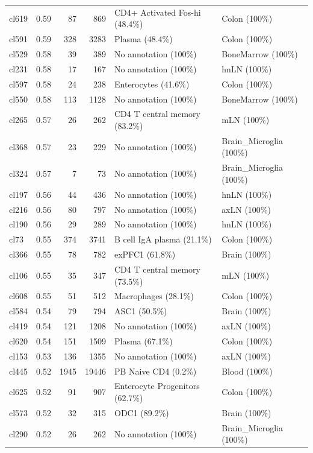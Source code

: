 \begin{table}[ht!]
\begin{tabular}{lrrrll}
  cl619 & 0.59 &  87 & 869 & CD4+ Activated Fos-hi (48.4\%) & Colon (100\%) \\ 
  cl591 & 0.59 & 328 & 3283 & Plasma (48.4\%) & Colon (100\%) \\ 
  cl529 & 0.58 &  39 & 389 & No annotation (100\%) & BoneMarrow (100\%) \\ 
  cl231 & 0.58 &  17 & 167 & No annotation (100\%) & hnLN (100\%) \\ 
  cl597 & 0.58 &  24 & 238 & Enterocytes (41.6\%) & Colon (100\%) \\ 
  cl550 & 0.58 & 113 & 1128 & No annotation (100\%) & BoneMarrow (100\%) \\ 
  cl265 & 0.57 &  26 & 262 & CD4 T central memory (83.2\%) & mLN (100\%) \\ 
  cl368 & 0.57 &  23 & 229 & No annotation (100\%) & Brain\_Microglia (100\%) \\ 
  cl324 & 0.57 &   7 &  73 & No annotation (100\%) & Brain\_Microglia (100\%) \\ 
  cl197 & 0.56 &  44 & 436 & No annotation (100\%) & hnLN (100\%) \\ 
  cl216 & 0.56 &  80 & 797 & No annotation (100\%) & axLN (100\%) \\ 
  cl190 & 0.56 &  29 & 289 & No annotation (100\%) & hnLN (100\%) \\ 
  cl73 & 0.55 & 374 & 3741 & B cell IgA plasma (21.1\%) & Colon (100\%) \\ 
  cl366 & 0.55 &  78 & 782 & exPFC1 (61.8\%) & Brain (100\%) \\ 
  cl106 & 0.55 &  35 & 347 & CD4 T central memory (73.5\%) & mLN (100\%) \\ 
  cl608 & 0.55 &  51 & 512 & Macrophages (28.1\%) & Colon (100\%) \\ 
  cl584 & 0.54 &  79 & 794 & ASC1 (50.5\%) & Brain (100\%) \\ 
  cl419 & 0.54 & 121 & 1208 & No annotation (100\%) & axLN (100\%) \\ 
  cl620 & 0.54 & 151 & 1509 & Plasma (67.1\%) & Colon (100\%) \\ 
  cl153 & 0.53 & 136 & 1355 & No annotation (100\%) & axLN (100\%) \\ 
  cl445 & 0.52 & 1945 & 19446 & PB Naive CD4  (0.2\%) & Blood (100\%) \\ 
  cl625 & 0.52 &  91 & 907 & Enterocyte Progenitors (62.7\%) & Colon (100\%) \\ 
  cl573 & 0.52 &  32 & 315 & ODC1 (89.2\%) & Brain (100\%) \\ 
  cl290 & 0.52 &  26 & 262 & No annotation (100\%) & Brain\_Microglia (100\%) \\ 

\end{tabular}
\end{table}
